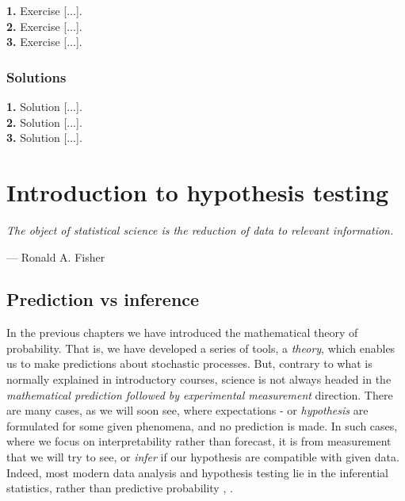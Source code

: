 \documentclass{book}
\begin{document}
\textbf{1.} Exercise [...].\\

\textbf{2.} Exercise [...].\\

\textbf{3.} Exercise [...].\\

\newpage

\subsection*{Solutions}

\textbf{1.} Solution [...].\\

\textbf{2.} Solution [...].\\

\textbf{3.} Solution [...].\\



\chapter{Introduction to hypothesis testing}

\epigraph{\textit{The object of statistical science is the reduction of data to relevant information.}}{— Ronald A. Fisher}

\section{Prediction vs inference}

In the previous chapters we have introduced the mathematical theory of probability. That is, we have developed a series of tools, a \textit{theory}, which enables us to make predictions about stochastic processes. But, contrary to what is normally explained in introductory courses, science is not always headed in the \textit{mathematical prediction followed by experimental measurement} direction. There are many cases, as we will soon see, where expectations - or \textit{hypothesis} are formulated for some given phenomena, and no prediction is made. In such cases, where we focus on interpretability rather than forecast, it is from measurement that we will try to see, or \textit{infer} if our hypothesis are compatible with given data. Indeed, most modern data analysis and hypothesis testing lie in the inferential statistics, rather than predictive probability \cite{fisher1925},  \cite{fisher1935}.\\
\end{document}
